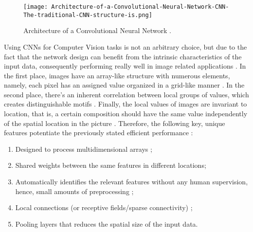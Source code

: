 \documentclass[class=report, crop=false, a4paper, 12pt]{standalone}
\begin{document}
\begin{figure}[t!]
    \centering
    \texttt{[image: Architecture-of-a-Convolutional-Neural-Network-CNN-The-traditional-CNN-structure-is.png]}
    \caption{Architecture of a Convolutional Neural Network \autocite{kangDeepSimilarityMetric2019}.}
    \label{fig:cnn}
\end{figure}

\par Using CNNs for Computer Vision tasks is not an arbitrary choice, but due to the fact that the network design can benefit from the intrinsic characteristics of the input data, consequently performing really well in image related applications \autocite{lecunDeepLearning2015,caoReviewNeuralNetworks2018}. In the first place, images have an array-like structure with numerous elements, namely, each pixel has an assigned value organized in a grid-like manner \autocite{yamashitaConvolutionalNeuralNetworks2018}. In the second place, there's an inherent correlation between local groups of values, which creates distinguishable motifs \autocite{lecunDeepLearning2015}. Finally, the local values of images are invariant to location, that is, a certain composition should have the same value independently of the spatial location in the picture \autocite{lecunDeepLearning2015}. Therefore, the following key, unique features potentiate the previously stated efficient performance \autocite{caoReviewNeuralNetworks2018}:
\begin{enumerate}
    \item Designed to process multidimensional arrays \autocite{lecunDeepLearning2015};
    \item Shared weights between the same features in different locations; %
    \item Automatically identifies the relevant features without any human supervision, hence, small amounts of preprocessing \autocite{alzubaidiReviewDeepLearning2021,liSurveyConvolutionalNeural2022}; %
    \item Local connections (or receptive fields/sparse connectivity) \autocite{alzubaidiReviewDeepLearning2021}; %
    \item Pooling layers that reduces the spatial size of the input data. %
\end{enumerate}
\end{document}
